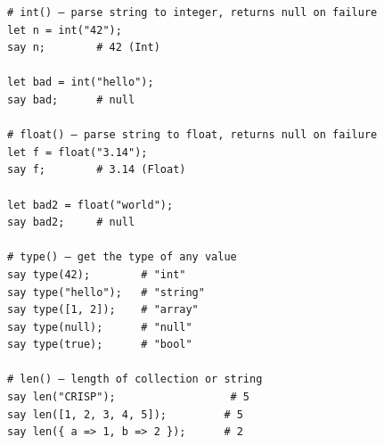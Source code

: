 \begin{tcolorbox}[colback=codebg, colframe=darkpurple, colbacktitle=darkpurple, title=\textbf{\textcolor{codegold}{Type Conversion}}, fonttitle=\bfseries, sharp corners]
\begin{lstlisting}
# int() — parse string to integer, returns null on failure
let n = int("42");
say n;        # 42 (Int)

let bad = int("hello");
say bad;      # null

# float() — parse string to float, returns null on failure
let f = float("3.14");
say f;        # 3.14 (Float)

let bad2 = float("world");
say bad2;     # null

# type() — get the type of any value
say type(42);        # "int"
say type("hello");   # "string"
say type([1, 2]);    # "array"
say type(null);      # "null"
say type(true);      # "bool"

# len() — length of collection or string
say len("CRISP");                  # 5
say len([1, 2, 3, 4, 5]);         # 5
say len({ a => 1, b => 2 });      # 2
\end{lstlisting}
\end{tcolorbox}
